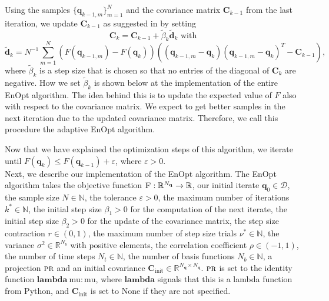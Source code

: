 Using the samples $\{\mathbf{q}_{k-1,m}\}_{m=1}^N$ and the covariance matrix $\mathbf{C}_{k-1}$ from the last iteration, we update $\mathbf{C}_{k-1}$ as suggested in \cite{Stordal2016-cj} by setting
\begin{equation}
\label{updateCov}
\mathbf{C}_k=\mathbf{C}_{k-1}+\tilde{\beta}_k\tilde{\mathbf{d}}_k\text{ with}
\end{equation}
\begin{equation}
\label{updateCovDirection}
\tilde{\mathbf{d}}_k=N^{-1}\sum_{m=1}^N(F(\mathbf{q}_{k-1,m})-F(\mathbf{q}_k))((\mathbf{q}_{k-1,m}-\mathbf{q}_k)(\mathbf{q}_{k-1,m}-\mathbf{q}_k)^T-\mathbf{C}_{k-1}),
\end{equation}
where $\tilde{\beta}_k$ is a step size that is chosen so that no entries of the diagonal of $\mathbf{C}_k$ are negative. How we set $\tilde{\beta}_k$ is shown below at the implementation of the entire EnOpt algorithm. The idea behind this is to update the expected value of $F$ also with respect to the covariance matrix. We expect to get better samples in the next iteration due to the updated covariance matrix. Therefore, we call this procedure the adaptive EnOpt algorithm.

Now that we have explained the optimization steps of this algorithm, we iterate until $F(\mathbf{q}_k)\leq F(\mathbf{q}_{k-1})+\varepsilon$, where $\varepsilon>0$.\\

Next, we describe our implementation of the EnOpt algorithm. The EnOpt algorithm takes the objective function $\textproc{F}:\mathbb{R}^{N_\mathbf{q}}\to\mathbb{R}$, our initial iterate $\mathbf{q}_0\in\mathcal{D}$, the sample size $N\in\mathbb{N}$, the tolerance $\varepsilon>0$, the maximum number of iterations $k^*\in\mathbb{N}$, the initial step size $\beta_1>0$ for the computation of the next iterate, the initial step size $\beta_2>0$ for the update of the covariance matrix, the step size contraction $r\in(0,1)$, the maximum number of step size trials $\nu^*\in\mathbb{N}$, the variance $\sigma^2\in\mathbb{R}^{N_b}$ with positive elements, the correlation coefficient $\rho\in(-1,1)$, the number of time steps $N_t\in\mathbb{N}$, the number of basis functions $N_b\in\mathbb{N}$, a projection $\textproc{pr}$ and an initial covariance $\mathbf{C}_\mathrm{init}\in\mathbb{R}^{N_\mathbf{q}\times N_\mathbf{q}}$. $\textproc{pr}$ is set to the identity function $\mathbf{lambda}\:\mathrm{mu}: \mathrm{mu}$, where $\mathbf{lambda}$ signals that this is a lambda function from Python, and $\mathbf{C}_\mathrm{init}$ is set to $\mathrm{None}$ if they are not specified.

